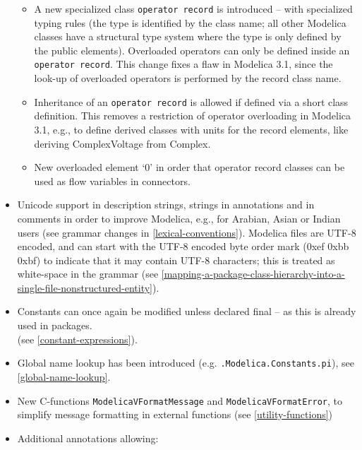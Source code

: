 \begin{itemize}
  \begin{itemize}
  \item
    A new specialized class \lstinline!operator record! is introduced -- with
    specialized typing rules (the type is identified by the class name;
    all other Modelica classes have a structural type system where the
    type is only defined by the public elements). Overloaded operators
    can only be defined inside an \lstinline!operator record!. This change fixes
    a flaw in Modelica 3.1, since the look-up of overloaded operators is
    performed by the record class name.
  \item
    Inheritance of an \lstinline!operator record! is allowed if defined via a
    short class definition. This removes a restriction of operator
    overloading in Modelica 3.1, e.g., to define derived classes with
    units for the record elements, like deriving ComplexVoltage from
    Complex.
  \item
    New overloaded element `0' in order that operator record classes can
    be used as flow variables in connectors.
  \end{itemize}
\item
  Unicode support in description strings, strings in annotations and in
  comments in order to improve Modelica, e.g., for Arabian, Asian or
  Indian users (see grammar changes in \autoref{lexical-conventions}). Modelica files are
  UTF-8 encoded, and can start with the UTF-8 encoded byte order mark
  (0xef 0xbb 0xbf) to indicate that it may contain UTF-8 characters;
  this is treated as white-space in the grammar (see \autoref{mapping-a-package-class-hierarchy-into-a-single-file-nonstructured-entity}).
\item
  Constants can once again be modified unless declared final -- as this
  is already used in packages.\\
  (see \autoref{constant-expressions}).
\item
  Global name lookup has been introduced (e.g.
  \lstinline!.Modelica.Constants.pi!), see \autoref{global-name-lookup}.
\item
  New C-functions \lstinline!ModelicaVFormatMessage! and \lstinline!ModelicaVFormatError!, to
  simplify message formatting in external functions (see \autoref{utility-functions})
\item
  Additional annotations allowing:


\end{itemize}
